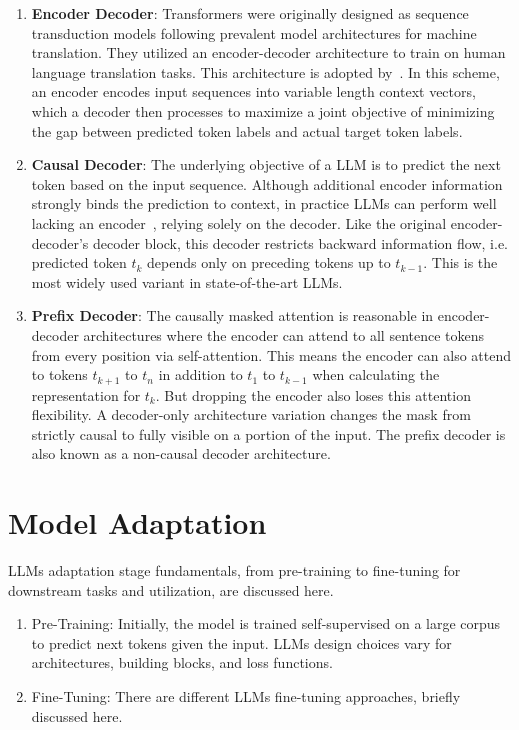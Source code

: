 \documentclass[a4paper,oneside]{book}
\begin{document}
\begin{enumerate}
    \item \textbf{Encoder Decoder}: Transformers were originally designed as sequence transduction models following prevalent model architectures for machine translation. They utilized an encoder-decoder architecture to train on human language translation tasks. This architecture is adopted by~\cite{raffel2020exploring, tay2022unifying}. In this scheme, an encoder encodes input sequences into variable length context vectors, which a decoder then processes to maximize a joint objective of minimizing the gap between predicted token labels and actual target token labels.

    \item \textbf{Causal Decoder}: The underlying objective of a LLM is to predict the next token based on the input sequence. Although additional encoder information strongly binds the prediction to context, in practice LLMs can perform well lacking an encoder~\cite{liu2018generating}, relying solely on the decoder. Like the original encoder-decoder's decoder block, this decoder restricts backward information flow, i.e. predicted token $t_k$ depends only on preceding tokens up to $t_{k-1}$. This is the most widely used variant in state-of-the-art LLMs.

    \item \textbf{Prefix Decoder}: The causally masked attention is reasonable in encoder-decoder architectures where the encoder can attend to all sentence tokens from every position via self-attention. This means the encoder can also attend to tokens $t_{k+1}$ to $t_n$ in addition to $t_1$ to $t_{k-1}$ when calculating the representation for $t_k$. But dropping the encoder also loses this attention flexibility. A decoder-only architecture variation changes the mask from strictly causal to fully visible on a portion of the input. The prefix decoder is also known as a non-causal decoder architecture.
\end{enumerate}

\section{Model Adaptation}
LLMs adaptation stage fundamentals, from pre-training to fine-tuning for downstream tasks and utilization, are discussed here.

\begin{enumerate}
    \item Pre-Training: Initially, the model is trained self-supervised on a large corpus to predict next tokens given the input. LLMs design choices vary for architectures, building blocks, and loss functions.

    \item Fine-Tuning: There are different LLMs fine-tuning approaches, briefly discussed here.
\end{enumerate}
\end{document}
